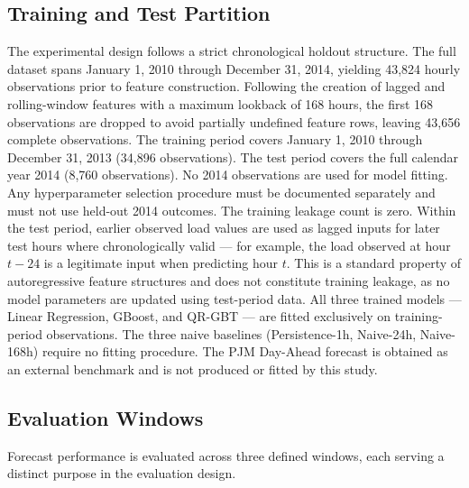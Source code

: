 \documentclass[12pt,a4paper]{article}
\begin{document}
\subsection{Training and Test Partition}
The experimental design follows a strict chronological holdout structure. The full dataset spans January 1, 2010 through December 31, 2014, yielding 43,824 hourly observations prior to feature construction. Following the creation of lagged and rolling-window features with a maximum lookback of 168 hours, the first 168 observations are dropped to avoid partially undefined feature rows, leaving 43,656 complete observations.
The training period covers January 1, 2010 through December 31, 2013 (34,896 observations). The test period covers the full calendar year 2014 (8,760 observations). No 2014 observations are used for model fitting. Any hyperparameter selection procedure must be documented separately and must not use held-out 2014 outcomes. The training leakage count is zero.
Within the test period, earlier observed load values are used as lagged inputs for later test hours where chronologically valid --- for example, the load observed at hour $t - 24$ is a legitimate input when predicting hour $t$. This is a standard property of autoregressive feature structures and does not constitute training leakage, as no model parameters are updated using test-period data.
All three trained models --- Linear Regression, GBoost, and QR-GBT --- are fitted exclusively on training-period observations. The three naive baselines (Persistence-1h, Naive-24h, Naive-168h) require no fitting procedure. The PJM Day-Ahead forecast is obtained as an external benchmark and is not produced or fitted by this study.
\subsection{Evaluation Windows}
Forecast performance is evaluated across three defined windows, each serving a distinct purpose in the evaluation design.
\end{document}
